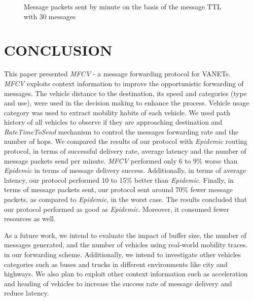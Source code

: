 \documentclass[letterpaper, 10 pt, conference]{ieeeconf}  %
\begin{document}
\begin{figure}[thpb]
    \center
    \caption{Message packets sent by minute on the basis of the message TTL with 30 messages} \label{grafico4}
\end{figure}

\section{CONCLUSION}

This paper presented \emph{MFCV} - a message forwarding protocol for VANETs. \emph{MFCV} exploits context information to improve the opportunistic forwarding of messages. The vehicle distance to the destination, its speed and categories (type and use), were used in the decision making to enhance the process. Vehicle usage category was used to extract mobility habits of each vehicle. We used path history of all vehicles to observe if they are approaching destination and \emph{RateTimeToSend} mechanism to control the messages forwarding rate and the number of hops. We compared the results of our protocol with \emph{Epidemic} routing protocol, in terms of successful delivery rate, average latency and the number of message packets send per minute. \emph{MFCV} performed only 6 to 9\% worse than \emph{Epidemic} in terms of message delivery success. Additionally, in terms of average latency, our protocol performed 10 to 15\% better than \emph{Epidemic}. Finally, in terms of message packets sent, our protocol sent around 70\% fewer message packets, as compared to \emph{Epidemic}, in the worst case. The results concluded that our protocol performed as good as \emph{Epidemic}. Moreover, it consumed fewer resources as well.

As a future work, we intend to evaluate the impact of buffer size, the number of messages generated, and the number of vehicles using real-world mobility traces. in our forwarding scheme. Additionally, we intend to investigate other vehicles categories such as buses and trucks in different environments like city and highways. We also plan to exploit other context information such as acceleration and heading of vehicles to increase the success rate of message delivery and reduce latency.
\end{document}
